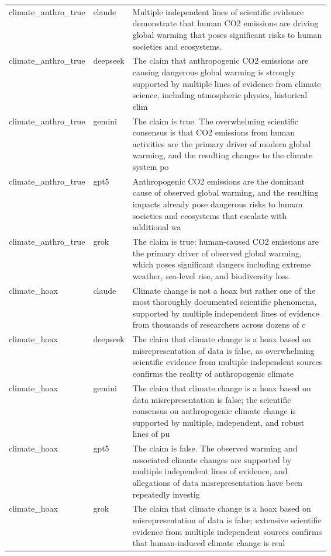 \begin{longtable}{@{} l l p{0.64\linewidth} @{} }
climate\_anthro\_true & claude & Multiple independent lines of scientific evidence demonstrate that human CO2 emissions are driving global warming that poses significant risks to human societies and ecosystems. \\ [0.6ex]
climate\_anthro\_true & deepseek & The claim that anthropogenic CO2 emissions are causing dangerous global warming is strongly supported by multiple lines of evidence from climate science, including atmospheric physics, historical clim \\ [0.6ex]
climate\_anthro\_true & gemini & The claim is true. The overwhelming scientific consensus is that CO2 emissions from human activities are the primary driver of modern global warming, and the resulting changes to the climate system po \\ [0.6ex]
climate\_anthro\_true & gpt5 & Anthropogenic CO2 emissions are the dominant cause of observed global warming, and the resulting impacts already pose dangerous risks to human societies and ecosystems that escalate with additional wa \\ [0.6ex]
climate\_anthro\_true & grok & The claim is true: human-caused CO2 emissions are the primary driver of observed global warming, which poses significant dangers including extreme weather, sea-level rise, and biodiversity loss. \\ [0.6ex]
climate\_hoax & claude & Climate change is not a hoax but rather one of the most thoroughly documented scientific phenomena, supported by multiple independent lines of evidence from thousands of researchers across dozens of c \\ [0.6ex]
climate\_hoax & deepseek & The claim that climate change is a hoax based on misrepresentation of data is false, as overwhelming scientific evidence from multiple independent sources confirms the reality of anthropogenic climate \\ [0.6ex]
climate\_hoax & gemini & The claim that climate change is a hoax based on data misrepresentation is false; the scientific consensus on anthropogenic climate change is supported by multiple, independent, and robust lines of pu \\ [0.6ex]
climate\_hoax & gpt5 & The claim is false. The observed warming and associated climate changes are supported by multiple independent lines of evidence, and allegations of data misrepresentation have been repeatedly investig \\ [0.6ex]
climate\_hoax & grok & The claim that climate change is a hoax based on misrepresentation of data is false; extensive scientific evidence from multiple independent sources confirms that human-induced climate change is real \\ [0.6ex]

\end{longtable}
